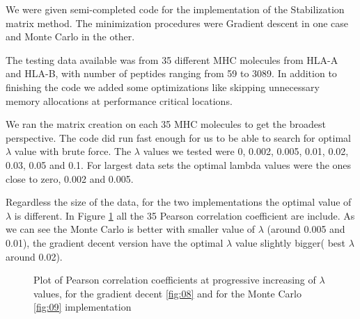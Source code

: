 \documentclass{bioinfo}
\begin{document}
\begin{application}
We were given semi-completed code for the implementation of the Stabilization matrix method. The minimization procedures were Gradient descent in one case and Monte Carlo in the other. 
\par The testing data available was from 35 different MHC molecules from HLA-A and HLA-B, with number of peptides ranging from 59 to 3089. In addition to finishing the code we added some optimizations like skipping unnecessary memory allocations at performance critical locations.
\par We ran the matrix creation on each 35 MHC molecules to get the broadest perspective. The code did run fast enough for us to be able to search for optimal $\lambda$ value with brute force. The $\lambda$ values we tested were 0, 0.002, 0.005, 0.01, 0.02, 0.03, 0.05 and 0.1. For largest data sets the optimal lambda values were the ones close to zero, 0.002 and 0.005.
\par Regardless the size of the data, for the two implementations the optimal value of $\lambda$ is different. In Figure \ref{fig:07} all the 35 Pearson correlation coefficient are include. As we can see the Monte Carlo is better with smaller value of $\lambda$ (around 0.005 and 0.01), the gradient decent version have the optimal $\lambda$ value slightly bigger( best $\lambda$ around 0.02).

\begin{figure}[!tpb]
\begin{center}
\end{center}
\caption{Plot of Pearson correlation coefficients at progressive increasing of $\lambda$ values, for the gradient decent \ref{fig:08} and for the Monte Carlo \ref{fig:09} implementation}
\label{fig:07}
\end{figure}


\end{application}
\end{document}
